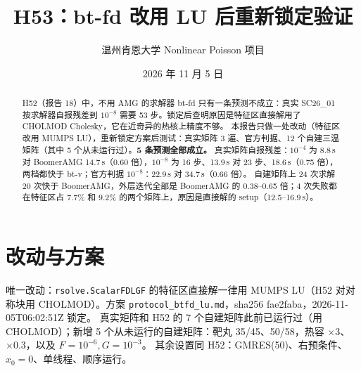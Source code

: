 \documentclass[11pt,a4paper]{ctexart}
\title{H53：bt-fd 改用 LU 后重新锁定验证}
\author{温州肯恩大学 \quad Nonlinear Poisson 项目}
\date{2026 年 11 月 5 日}
\begin{document}
\maketitle
\begin{center}\end{center}

\begin{abstract}
H52（报告 18）中，不用 AMG 的求解器 bt-fd 只有一条预测不成立：真实 SC26\_01 按求解器自报残差到 $10^{-8}$ 需要 53 步。锁定后查明原因是特征区直接解用了 CHOLMOD Cholesky，它在近奇异的热核上精度不够。
本报告只做一处改动（特征区改用 MUMPS LU），重新锁定方案后测试：真实矩阵 3 遍、官方判据、12 个自建三温矩阵（其中 5 个从未运行过）。\textbf{5 条预测全部成立。}
真实矩阵自报残差：$10^{-4}$ 为 8.8\,s 对 BoomerAMG 14.7\,s（0.60 倍），$10^{-8}$ 为 16 步、13.9\,s 对 23 步、18.6\,s（0.75 倍），两档都快于 bt-v；官方判据 $10^{-8}$：22.9\,s 对 34.7\,s（0.66 倍）。
自建矩阵上 24 次求解 20 次快于 BoomerAMG，外层迭代全部是 BoomerAMG 的 0.38--0.65 倍；4 次失败都在特征区占 7.7\% 和 9.2\% 的两个矩阵上，原因是直接解的 setup（12.5--16.9\,s）。
\end{abstract}

\section{改动与方案}
\sloppy
唯一改动：\texttt{rsolve.ScalarFDLGF} 的特征区直接解一律用 MUMPS LU（H52 对对称块用 CHOLMOD）。方案 \texttt{protocol\_btfd\_lu.md}，sha256 fae2faba，2026-11-05T06:02:51Z 锁定。
真实矩阵和 H52 的 7 个自建矩阵此前已运行过（用 CHOLMOD）；新增 5 个从未运行的自建矩阵：靶丸 35/45、50/58，热容 $\times3$、$\times0.3$，以及 $F=10^{-6},G=10^{-3}$。
其余设置同 H52：GMRES(50)、右预条件、$x_0=0$、单线程、顺序运行。
\end{document}
